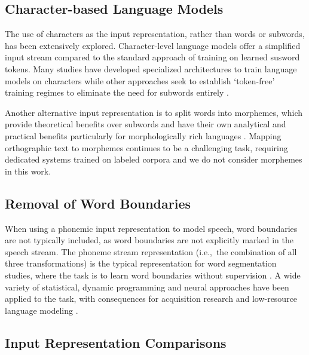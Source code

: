 \subsection{Character-based Language Models}

The use of characters as the input representation, rather than words or subwords, has been extensively explored. Character-level language models offer a simplified input stream compared to the standard approach of training on learned susword tokens. Many studies have developed specialized architectures to train language models on characters \citep{jozefowicz2016exploringlimitslanguagemodeling, kim2016character, ma-etal-2020-charbert, al-rfou_character-level_2019} while other approaches seek to establish `token-free' training regimes to eliminate the need for subwords entirely \citep{clark-etal-2022-canine, xue-2022-byt5}.

Another alternative input representation is to split words into morphemes, which provide theoretical benefits over subwords and have their own analytical and practical benefits particularly for morphologically rich languages \citep{ustun-etal-2018-characters, nzeyimana-niyongabo-rubungo-2022-kinyabert, fan-sun-2023-constructivist}. Mapping orthographic text to morphemes continues to be a challenging task, requiring dedicated systems trained on labeled corpora \citep{batsuren-etal-2022-sigmorphon} and we do not consider morphemes in this work.

\subsection{Removal of Word Boundaries}

When using a phonemic input representation to model speech, word boundaries are not typically included, as word boundaries are not explicitly marked in the speech stream. The phoneme stream representation (i.e.,\ the combination of all three transformations) is the typical representation for word segmentation studies, where the task is to learn word boundaries without supervision \citep{Brent1999}. A wide variety of statistical, dynamic programming and neural approaches have been applied to the task, with consequences for acquisition research and low-resource language modeling \citep{Blanchard2010, Coltekin2017, algayres_dp-parse_2022, goriely2023word}.

\subsection{Input Representation Comparisons}

